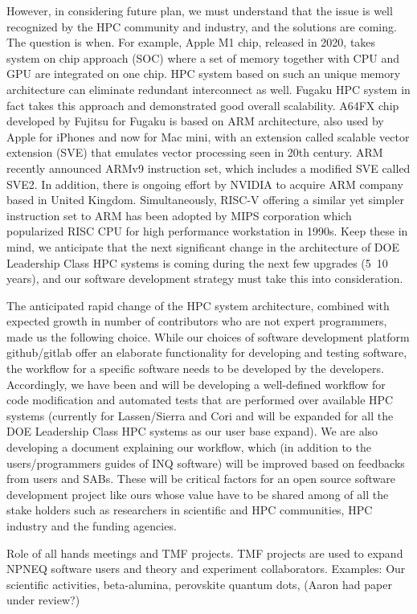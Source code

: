 However, in considering future plan, we must understand that the issue is well recognized by the HPC community and industry, and the solutions are coming. The question is when. For example, Apple M1 chip, released in 2020, takes system on chip approach (SOC) where a set of memory together with CPU and GPU are integrated on one chip. HPC system based on such an unique memory architecture can eliminate redundant interconnect as well. Fugaku HPC system in fact takes this approach and demonstrated good overall scalability. A64FX chip developed by Fujitsu for Fugaku is based on ARM architecture, also used by Apple for iPhones and now for Mac mini, with an extension called scalable vector extension (SVE) that emulates vector processing seen in 20th century. ARM recently announced ARMv9 instruction set, which includes a modified SVE called SVE2. In addition, there is ongoing effort by NVIDIA to acquire ARM company based in United Kingdom. Simultaneously, RISC-V offering a similar yet simpler instruction set to ARM has been adopted by MIPS corporation which popularized RISC CPU for high performance workstation in 1990s. Keep these in mind, we anticipate that the next significant change in the architecture of DOE Leadership Class HPC systems is coming during the next few upgrades (5~10 years), and our software development strategy must take this into consideration. 

 The anticipated rapid change of the HPC system architecture, combined with expected growth in number of contributors who are not expert programmers, made us the following choice. While our choices of software development platform github/gitlab offer an elaborate functionality for developing and testing software, the workflow for a specific software needs to be developed by the developers. Accordingly, we have been and will be developing a well-defined workflow for code modification and automated tests that are performed over available HPC systems (currently for Lassen/Sierra and Cori and will be expanded for all the DOE Leadership Class HPC systems as our user base expand). We are also developing a document explaining our workflow, which (in addition to the users/programmers guides of INQ software) will be improved based on feedbacks from users and SABs. These will be critical factors for an open source software development project like ours whose value have to be shared among of all the stake holders such as researchers in scientific and HPC communities, HPC industry and the funding agencies. 
 
Role of all hands meetings and TMF projects. TMF projects are used to expand NPNEQ software users and theory and experiment collaborators. Examples:
Our scientific activities, beta-alumina, perovskite quantum dots, (Aaron had paper under review?)

